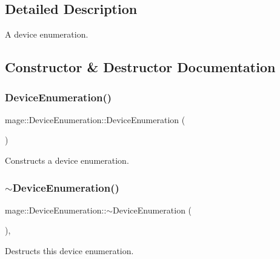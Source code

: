 \subsection{Detailed Description}
A device enumeration. 

\subsection{Constructor \& Destructor Documentation}
\hypertarget{classmage_1_1_device_enumeration_aa000048648beb6c2aca70e5ef04e0da2}{}\label{classmage_1_1_device_enumeration_aa000048648beb6c2aca70e5ef04e0da2} 
\subsubsection{\texorpdfstring{Device\+Enumeration()}{DeviceEnumeration()}\hspace{0.1cm}{\footnotesize\ttfamily [1/3]}}
{\footnotesize\ttfamily mage\+::\+Device\+Enumeration\+::\+Device\+Enumeration (\begin{DoxyParamCaption}{ }\end{DoxyParamCaption})\hspace{0.3cm}{\ttfamily [private]}}

Constructs a device enumeration. \hypertarget{classmage_1_1_device_enumeration_ae32bc5dacf47b7deca4729d8b3cb66dc}{}\label{classmage_1_1_device_enumeration_ae32bc5dacf47b7deca4729d8b3cb66dc} 
\subsubsection{\texorpdfstring{$\sim$\+Device\+Enumeration()}{~DeviceEnumeration()}}
{\footnotesize\ttfamily mage\+::\+Device\+Enumeration\+::$\sim$\+Device\+Enumeration (\begin{DoxyParamCaption}{ }\end{DoxyParamCaption})\hspace{0.3cm}{\ttfamily [private]}, {\ttfamily [default]}}

Destructs this device enumeration. \hypertarget{classmage_1_1_device_enumeration_a90f3dc13cfb413aa8a2a49a31bcb6ae3}{}\label{classmage_1_1_device_enumeration_a90f3dc13cfb413aa8a2a49a31bcb6ae3} 
